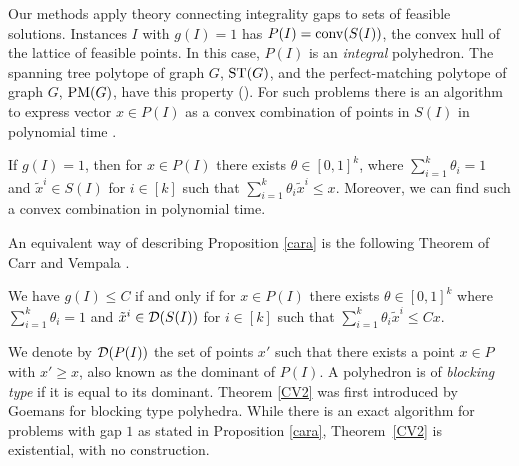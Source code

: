 Our methods apply theory connecting integrality gaps to sets of feasible solutions. Instances $I$ with  $g(I)=1$ has $P(I)=\operatorname{conv}(S(I))$, the convex hull of the lattice of feasible points. In this case, $P(I)$ is an \textit{integral} polyhedron. The spanning tree polytope of graph $G$, $\operatorname{ST}(G)$, and the perfect-matching polytope of graph $G$, $\operatorname{{{PM}}}(G)$, have this property (\cite{Edmonds2003,edmondsPM}). For such problems there is an algorithm to express vector $x\in P(I)$ as a convex combination of points in $S(I)$ in polynomial time \cite{cons-cara}.

\begin{proposition}\label{cara}
	If $g(I)=1$, then for $x\in P(I)$ there exists $\theta \in [0,1]^k$, where $\sum_{i=1}^{k}\theta_i =1$ and $\tilde{x}^i\in S(I)$ for $i\in [k]$ such that $\sum_{i=1}^{k}\theta_i \tilde{x}^i\leq x$. Moreover, we can find such a convex combination in polynomial time.
\end{proposition}

An equivalent way of describing Proposition \ref{cara} is the following Theorem of Carr and Vempala \cite{Carr2004}.

\begin{thm} \label{CV2}
	We have $g(I) \leq C$ if and only if for  $x\in P(I)$ there exists $\theta \in [0,1]^k$ where $\sum_{i=1}^{k}\theta_i =1$ and $\tilde{x}^i\in \operatorname{\mathcal{D}}(S(I))$ for $i\in [k]$ such that $\sum_{i=1}^{k}\theta_i \tilde{x}^i\leq Cx$.
\end{thm}
We denote by $\operatorname{\mathcal{D}}(P(I))$ the set of points $x'$ such that there exists a point $x\in P$ with $x'\geq x$, also known as the dominant of $P(I)$. A polyhedron is of \textit{blocking type} if it is equal to its dominant. Theorem \ref{CV2} was first introduced by Goemans \cite{goemansblocking} for blocking type polyhedra. While there is an exact algorithm for problems with gap $1$ as stated in Proposition \ref{cara}, Theorem~\ref{CV2} is existential, with no construction.
\iffalse

